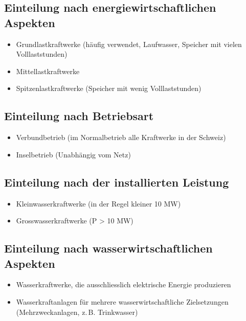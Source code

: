 \subsection{Einteilung nach energiewirtschaftlichen Aspekten}
\begin{itemize}
    \item Grundlastkraftwerke (häufig verwendet, Laufwasser, Speicher mit vielen Volllaststunden)
    \item Mittellastkraftwerke
    \item Spitzenlastkraftwerke (Speicher mit wenig Volllaststunden)
\end{itemize}

\subsection{Einteilung nach Betriebsart}
\begin{itemize}
    \item Verbundbetrieb (im Normalbetrieb alle Kraftwerke in der Schweiz)
    \item Inselbetrieb (Unabhängig vom Netz)
\end{itemize}

\subsection{Einteilung nach der installierten Leistung}
\begin{itemize}
    \item Kleinwasserkraftwerke (in der Regel kleiner 10 MW)
    \item Grosswasserkraftwerke (P > 10 MW)
\end{itemize}

\subsection{Einteilung nach wasserwirtschaftlichen Aspekten}
\begin{itemize}
    \item Wasserkraftwerke, die ausschliesslich elektrische Energie produzieren
    \item Wasserkraftanlagen für mehrere wasserwirtschaftliche Zielsetzungen (Mehrzweckanlagen, z.\,B. Trinkwasser)
\end{itemize}

